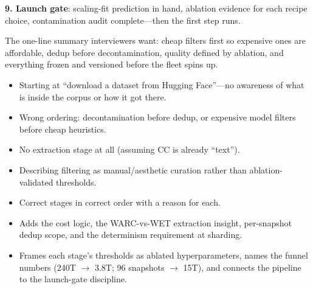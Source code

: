 \begin{interviewq}
\textbf{9. Launch gate}: scaling-fit prediction in hand, ablation evidence for each recipe choice, contamination audit complete---then the first step runs.

The one-line summary interviewers want: cheap filters first so expensive ones are affordable, dedup before decontamination, quality defined by ablation, and everything frozen and versioned before the fleet spins up.

\redflags
\begin{itemize}
    \item Starting at ``download a dataset from Hugging Face''---no awareness of what is inside the corpus or how it got there.
    \item Wrong ordering: decontamination before dedup, or expensive model filters before cheap heuristics.
    \item No extraction stage at all (assuming CC is already ``text'').
    \item Describing filtering as manual/aesthetic curation rather than ablation-validated thresholds.
\end{itemize}


\goodgreat
\begin{itemize}
    \item {} Correct stages in correct order with a reason for each.
    \item {} Adds the cost logic, the WARC-vs-WET extraction insight, per-snapshot dedup scope, and the determinism requirement at sharding.
    \item {} Frames each stage's thresholds as ablated hyperparameters, names the funnel numbers (240T $\rightarrow$ 3.8T; 96 snapshots $\rightarrow$ 15T), and connects the pipeline to the launch-gate discipline.
\end{itemize}

\end{interviewq}

